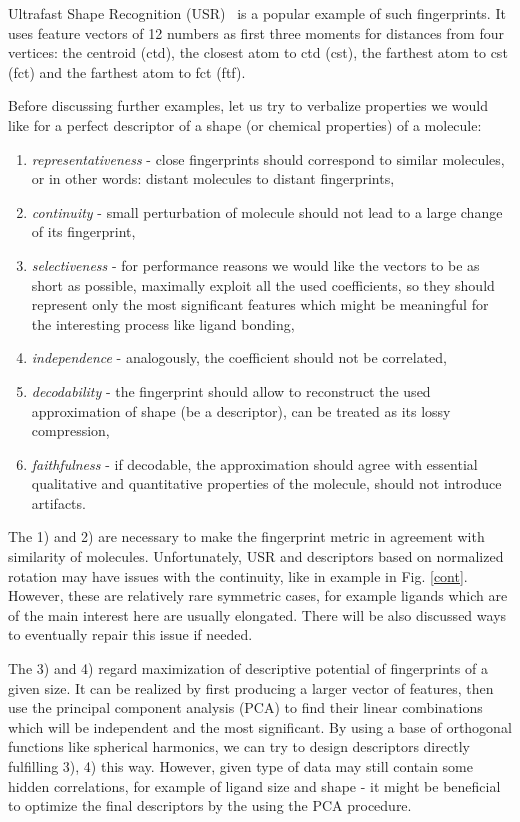 \documentclass[10pt,journal]{IEEEtranTCOM}
\theoremstyle{plain}
\begin{document}
Ultrafast Shape Recognition (USR)~\cite{USR} is a popular example of such fingerprints. It uses feature vectors of 12 numbers as first three moments for distances from four vertices: the centroid (ctd), the closest atom to ctd (cst), the farthest atom to cst (fct) and the farthest atom to fct (ftf).

Before discussing further examples, let us try to verbalize properties we would like for a perfect descriptor of a shape (or chemical properties) of a molecule:
\begin{enumerate}
  \item \emph{representativeness} - close fingerprints should correspond to similar molecules, or in other words: distant molecules to distant fingerprints,
  \item \emph{continuity} - small perturbation of molecule should not lead to a large change of its fingerprint,
  \item \emph{selectiveness} - for performance reasons we would like the vectors to be as short as possible, maximally exploit all the used coefficients, so they should represent only the most significant features which might be meaningful for the interesting process like ligand bonding,
  \item \emph{independence} - analogously, the coefficient should not be correlated,
  \item \emph{decodability} - the fingerprint should allow to reconstruct the used approximation of shape (be a descriptor), can be treated as its lossy compression,
  \item \emph{faithfulness} - if decodable, the approximation should agree with essential qualitative and quantitative properties of the molecule, should not introduce artifacts.
\end{enumerate}
The 1) and 2) are necessary to make the fingerprint metric in agreement with similarity of molecules. Unfortunately, USR and descriptors based on normalized rotation may have issues with the continuity, like in example in Fig. \ref{cont}. However, these are relatively rare symmetric cases, for example ligands which are of the main interest here are usually elongated. There will be also discussed ways to eventually repair this issue if needed.

The 3) and 4) regard maximization of descriptive potential of fingerprints of a given size. It can be realized by first producing a larger vector of features, then use the principal component analysis (PCA) to find their linear combinations which will be independent and the most significant. By using a base of orthogonal functions like spherical harmonics,  we can try to design descriptors directly fulfilling 3), 4) this way. However, given type of data may still contain some hidden correlations, for example of ligand size and shape - it might be beneficial to optimize the final descriptors by the using the PCA procedure.
\end{document}

